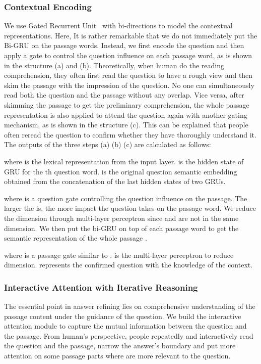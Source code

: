 \documentclass[letterpaper]{article} \usepackage{aaai18}  \usepackage{times}  \usepackage{helvet}  \usepackage{courier}  \usepackage{url}  \usepackage{graphicx}  \usepackage{booktabs}
\begin{document}
 \subsubsection{Contextual Encoding} We use Gated Recurrent Unit~\cite{Cho2014Learning} with bi-directions to model the contextual representations. Here, It is rather remarkable that we do not immediately put the Bi-GRU on the passage words. Instead, we first encode the question and then apply a gate to control the question influence on each passage word, as is shown in the structure (a) and (b). Theoretically, when human do the reading comprehension, they often first read the question to have a rough view and then skim the passage with the impression of the question. No one can simultaneously read both the question and the passage without any overlap. Vice versa, after skimming the passage to get the preliminary comprehension, the whole passage representation is also applied to attend the question again with another gating mechanism, as is shown in the structure (c). This can be explained that people often reread the question to confirm whether they have thoroughly understand it. The outputs of the three steps (a) (b) (c) are calculated as follows:
  
 where  is the lexical representation from the input layer.  is the hidden state of GRU for the th question word.  is the original question semantic embedding obtained from the concatenation of the last hidden states of two GRUs.  
 
where  is a question gate controlling the question influence on the passage. The larger the  is, the more impact the question takes on the passage word. We reduce the  dimension through multi-layer perceptron  since  and  are not in the same dimension. We then put the bi-GRU on top of each passage word to get the semantic representation of the whole passage .    

 where  is a passage gate similar to .  is the multi-layer perceptron to reduce dimension.  represents the confirmed question with the knowledge of the context.
 
 \subsubsection{Interactive Attention with Iterative Reasoning} 
 The essential point in answer refining lies on comprehensive understanding of the passage content under the guidance of the question. We build the interactive attention module to capture the mutual information between the question and the passage. From human's perspective, people repeatedly and interactively read the question and the passage, narrow the answer's boundary and put more attention on some passage parts where are more relevant to the question. 
 
\end{document}
